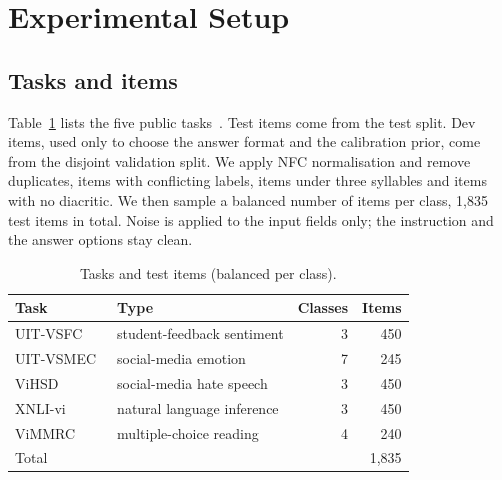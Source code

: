 \documentclass[conference]{IEEEtran}
\begin{document}
\section{Experimental Setup}\label{sec:setup}

\subsection{Tasks and items}
Table~\ref{tab:tasks} lists the five public tasks~\cite{nguyen2018vsfc,ho2019vsmec,luu2021vihsd,conneau2018xnli,nguyen2020vimmrc}. Test items come from the test split. Dev items, used only to choose the answer format and the calibration prior, come from the disjoint validation split. We apply NFC normalisation and remove duplicates, items with conflicting labels, items under three syllables and items with no diacritic. We then sample a balanced number of items per class, 1,835 test items in total. Noise is applied to the input fields only; the instruction and the answer options stay clean.

\begin{table}[t]
\centering
\caption{Tasks and test items (balanced per class).}
\label{tab:tasks}
\begin{tabular}{@{}llrr@{}}
\toprule
Task & Type & Classes & Items \\
\midrule
UIT-VSFC~\cite{nguyen2018vsfc} & student-feedback sentiment & 3 & 450 \\
UIT-VSMEC~\cite{ho2019vsmec} & social-media emotion & 7 & 245 \\
ViHSD~\cite{luu2021vihsd} & social-media hate speech & 3 & 450 \\
XNLI-vi~\cite{conneau2018xnli} & natural language inference & 3 & 450 \\
ViMMRC~\cite{nguyen2020vimmrc} & multiple-choice reading & 4 & 240 \\
\midrule
Total & & & 1,835 \\
\bottomrule
\end{tabular}
\end{table}
\end{document}
